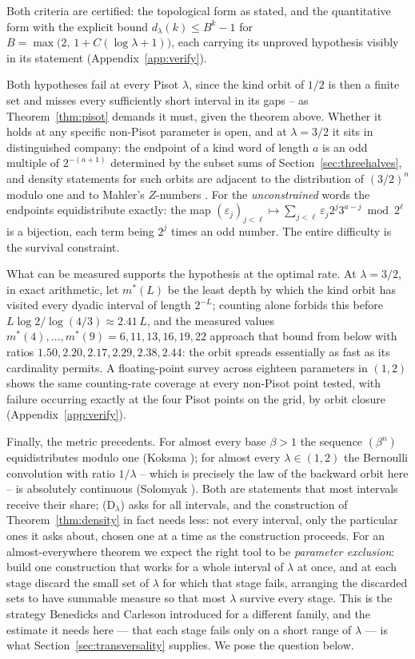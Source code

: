 \documentclass[11pt,reqno]{amsart}
\theoremstyle{plain}
\theoremstyle{definition}
\theoremstyle{remark}
\begin{document}
Both criteria are certified: the topological form as stated, and the
quantitative form with the explicit bound $d_\lambda(k)\leq B^k-1$ for
$B=\max\bigl(2,\,1+C(\log\lambda+1)\bigr)$, each carrying its unproved
hypothesis visibly in its statement (Appendix~\ref{app:verify}).

Both hypotheses fail at every Pisot $\lambda$, since the kind orbit
of $1/2$ is then a finite set and misses every sufficiently short interval in
its gaps -- as Theorem~\ref{thm:pisot} demands it must, given the theorem
above. Whether it holds at any specific non-Pisot parameter is open, and at
$\lambda=3/2$ it sits in distinguished company: the endpoint of a kind word of
length $a$ is an odd multiple of $2^{-(a+1)}$ determined by the subset sums of
Section~\ref{sec:threehalves}, and density statements for such orbits are
adjacent to the distribution of $(3/2)^n$ modulo one and to Mahler's
$Z$-numbers \cite{Mahler1968}. For the \emph{unconstrained} words the
endpoints equidistribute exactly: the map
$(\varepsilon_j)_{j<\ell}\mapsto\sum_{j<\ell}\varepsilon_j2^j3^{a-j}\bmod
2^\ell$ is a bijection, each term being $2^j$ times an odd number. The entire
difficulty is the survival constraint.

What can be measured supports the hypothesis at the optimal rate. At
$\lambda=3/2$, in exact arithmetic, let $m^*(L)$ be the least depth by which
the kind orbit has visited every dyadic interval of length $2^{-L}$; counting
alone forbids this before $L\log2/\log(4/3)\approx2.41\,L$, and the measured
values $m^*(4),\dots,m^*(9)=6,11,13,16,19,22$ approach that bound from below
with ratios $1.50,2.20,2.17,2.29,2.38,2.44$: the orbit spreads essentially as
fast as its cardinality permits. A floating-point survey across eighteen
parameters in $(1,2)$ shows the same counting-rate coverage at every non-Pisot
point tested, with failure occurring exactly at the four Pisot points on the
grid, by orbit closure (Appendix~\ref{app:verify}).

Finally, the metric precedents. For almost every base $\beta>1$ the sequence
$(\beta^n)$ equidistributes modulo one (Koksma \cite{Koksma1935}); for almost
every $\lambda\in(1,2)$ the Bernoulli convolution with ratio $1/\lambda$ --
which is precisely the law of the backward orbit here -- is absolutely
continuous (Solomyak \cite{Solomyak1995}). Both are statements that most
intervals receive their share; (D$_\lambda$) asks for all intervals, and the
construction of Theorem~\ref{thm:density} in fact needs less: not every
interval, only the particular ones it asks about, chosen one at a time as the
construction proceeds. For an almost-everywhere theorem we expect the right tool to be
\emph{parameter exclusion}: build one construction that works for a whole
interval of $\lambda$ at once, and at each stage discard the small set of
$\lambda$ for which that stage fails, arranging the discarded sets to have
summable measure so that most $\lambda$ survive every stage. This is the
strategy Benedicks and Carleson introduced for a different family, and the
estimate it needs here --- that each stage fails only on a short range of
$\lambda$ --- is what Section~\ref{sec:transversality} supplies. We pose the
question below.
\end{document}
